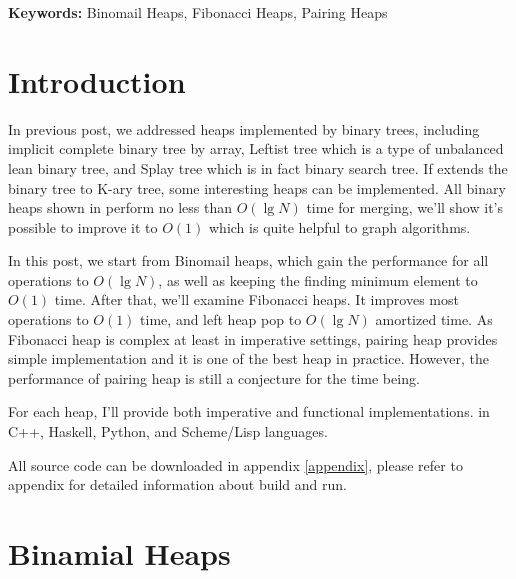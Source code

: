\documentclass{article}
\begin{document}
\vspace{3cm}
{\bfseries Keywords:} Binomail Heaps, Fibonacci Heaps, Pairing Heaps


\maketitle

\section{Introduction}
\label{introduction}

In previous post, we addressed heaps implemented by binary trees, including
implicit complete binary tree by array, Leftist tree which is a type of 
unbalanced lean binary tree, and Splay tree which is in fact binary search
tree. If extends the binary tree to K-ary tree, some interesting heaps
can be implemented. All binary heaps shown in \cite{lxy-bheap} perform
no less than $O(\lg N)$ time for merging, we'll show it's possible to 
improve it to $O(1)$ which is quite helpful to graph algorithms.

In this post, we start from Binomail heaps, which gain the performance for
all operations to $O(\lg N)$, as well as keeping the finding minimum element to 
$O(1)$ time. After that, we'll examine Fibonacci heaps. It improves most 
operations to $O(1)$ time, and left heap pop to $O(\lg N)$ amortized time.
As Fibonacci heap is complex at least in imperative settings, pairing heap
provides simple implementation and it is one of the best heap in practice.
However, the performance of pairing heap is still a conjecture for the
time being.

For each heap, I'll provide both imperative and functional implementations.
in C++, Haskell, Python, and Scheme/Lisp languages. 

All source code can be downloaded in appendix \ref{appendix}, please 
refer to appendix for detailed information about build and run.


\section{Binamial Heaps}
\label{binomail-heap}
\end{document}
